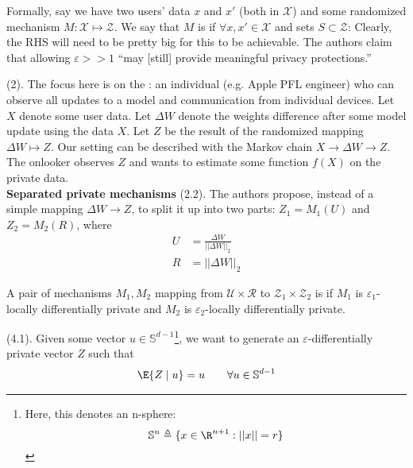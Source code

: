 \documentclass[11pt]{article}
\begin{document}
Formally, say we have two users' data $x$ and $x'$ (both in $\mathcal X$) and some randomized mechanism $M : \mathcal X \mapsto \mathcal Z$. We say that $M$ is  if $\forall x, x' \in \mathcal X$ and sets $S \subset \mathcal Z$:
Clearly, the RHS will need to be pretty big for this to be achievable. The authors claim that allowing $\varepsilon >> 1$ ``may [still] provide meaningful privacy protections.''

 (2). The focus here is on the : an individual (e.g. Apple PFL engineer) who can observe all updates to a model and communication from individual devices. Let $X$ denote some user data. Let $\Delta W$ denote the weights difference after some model update using the data $X$. Let $Z$ be the result of the randomized mapping $\Delta W \mapsto Z$. Our setting can be described with the Markov chain $X \rightarrow \Delta W \rightarrow Z$. The onlooker observes $Z$ and wants to estimate some function $f(X)$ on the private data.\\

\textbf{Separated private mechanisms} (2.2). The authors propose, instead of a simple mapping $\Delta W \rightarrow Z$, to split it up into two parts: $Z_1 = M_1(U)$ and $Z_2 = M_2(R)$, where 
\begin{align}
	U &= \frac{\Delta W}{||\Delta W||_2} \\
	R &= ||\Delta W||_2
\end{align}

\begin{definition}
	A pair of mechanisms $M_1, M_2$ mapping from $\mathcal U \times \mathcal R$ to $\mathcal Z_1 \times \mathcal Z_2$ is  if  $M_1$ is $\varepsilon_1$-locally differentially private and $M_2$ is $\varepsilon_2$-locally differentially private.
\end{definition}



 (4.1). Given some vector $u \in \mathbb{S}^{d-1}$\footnote{Here, this denotes an n-sphere: $$ \mathbb{S}^n \triangleq \{ x \in \R^{n+1} : ||x|| = r  \} $$}, we want to generate an $\varepsilon$-differentially private vector $Z$ such that
\begin{align}
	\E{Z \mid u} = u \qquad \forall u \in \mathbb{S}^{d-1}
\end{align}
\end{document}
